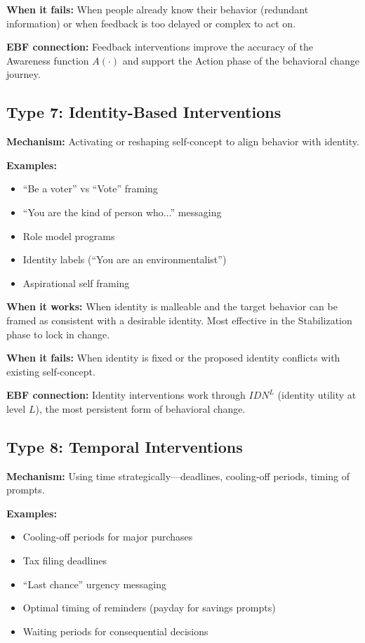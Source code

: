 \textbf{When it fails:} When people already know their behavior (redundant information) or when feedback is too delayed or complex to act on.

\textbf{EBF connection:} Feedback interventions improve the accuracy of the Awareness function $A(\cdot)$ and support the Action phase of the behavioral change journey.

\subsection{Type 7: Identity-Based Interventions}

\textbf{Mechanism:} Activating or reshaping self-concept to align behavior with identity.

\textbf{Examples:}
\begin{itemize}[nosep]
\item ``Be a voter'' vs ``Vote'' framing \citep{bryan2011}
\item ``You are the kind of person who...'' messaging
\item Role model programs
\item Identity labels (``You are an environmentalist'')
\item Aspirational self framing
\end{itemize}

\textbf{When it works:} When identity is malleable and the target behavior can be framed as consistent with a desirable identity. Most effective in the Stabilization phase to lock in change.

\textbf{When it fails:} When identity is fixed or the proposed identity conflicts with existing self-concept.

\textbf{EBF connection:} Identity interventions work through $IDN^L$ (identity utility at level $L$), the most persistent form of behavioral change.

\subsection{Type 8: Temporal Interventions}

\textbf{Mechanism:} Using time strategically---deadlines, cooling-off periods, timing of prompts.

\textbf{Examples:}
\begin{itemize}[nosep]
\item Cooling-off periods for major purchases
\item Tax filing deadlines
\item ``Last chance'' urgency messaging
\item Optimal timing of reminders (payday for savings prompts)
\item Waiting periods for consequential decisions
\end{itemize}

